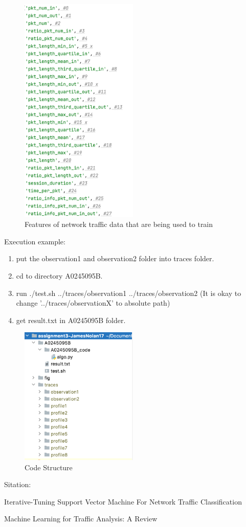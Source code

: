 \documentclass[12pt]{article}
\begin{document}
\begin{figure}[h]
    \centering
    \includegraphics[width=0.5\textwidth]{fig/feature}
    \caption{Features of network traffic data that are being used to train}
    \label{fig:feature}
\end{figure}

Execution example: 
\begin{enumerate}
  \item put the observation1 and observation2 folder into traces folder.
  \item cd to directory A0245095B.
  \item run ./test.sh ../traces/observation1 ../traces/observation2 (It is okay to change '../traces/observationX' to absolute path)
  \item get result.txt in A0245095B folder.
\end{enumerate}


\begin{figure}[h]
    \centering
    \includegraphics[width=0.5\textwidth]{fig/code}
    \caption{Code Structure}
    \label{fig:code structure}
\end{figure}

Sitation: 


Iterative-Tuning Support Vector Machine For Network Traffic Classification


Machine Learning for Traffic Analysis: A Review
\end{document}
